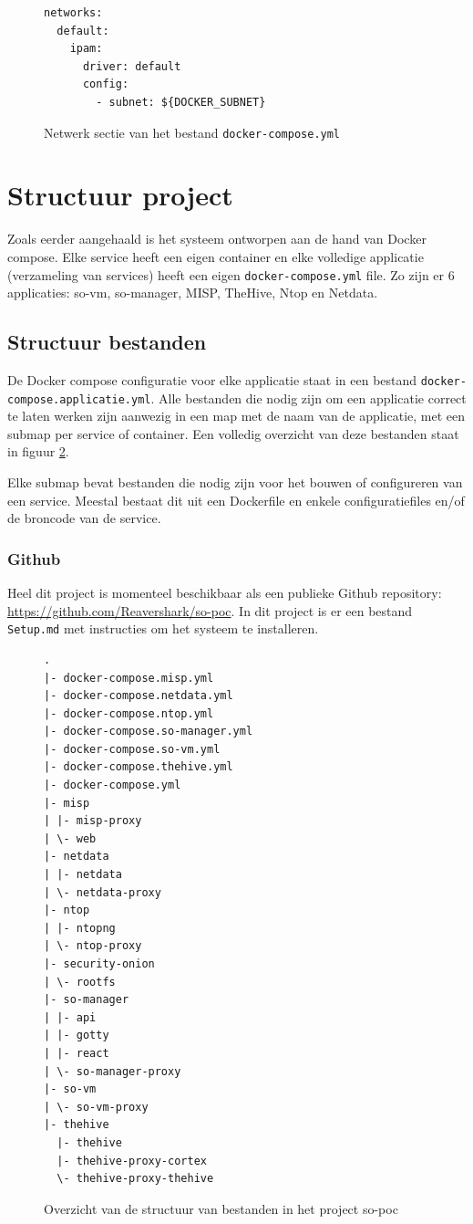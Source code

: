 \documentclass[a4paper, 12pt]{report}
\begin{document}
\begin{figure}[H]
  \begin{lstlisting}
networks:
  default:
    ipam:
      driver: default
      config:
        - subnet: ${DOCKER_SUBNET}
  \end{lstlisting}
  \caption{Netwerk sectie van het bestand \lstinline|docker-compose.yml|}
  \label{fig:docker-compose-network}
\end{figure}

\section{Structuur project}
Zoals eerder aangehaald is het systeem ontworpen aan de hand van Docker compose.
Elke service heeft een eigen container en elke volledige applicatie (verzameling van services) heeft een eigen \lstinline|docker-compose.yml| file.
Zo zijn er 6 applicaties: so-vm, so-manager, MISP, TheHive, Ntop en Netdata.

\subsection{Structuur bestanden}
De Docker compose configuratie voor elke applicatie staat in een bestand \lstinline|docker-compose.applicatie.yml|.
Alle bestanden die nodig zijn om een applicatie correct te laten werken zijn aanwezig in een map met de naam van de applicatie, met een submap per service of container.
Een volledig overzicht van deze bestanden staat in figuur \ref{fig:so-poc-structuur-docker-compose-containers}.

Elke submap bevat bestanden die nodig zijn voor het bouwen of configureren van een service.
Meestal bestaat dit uit een Dockerfile en enkele configuratiefiles en/of de broncode van de service.

\subsubsection{Github}
Heel dit project is momenteel beschikbaar als een publieke Github repository: \url{https://github.com/Reavershark/so-poc}.
In dit project is er een bestand \lstinline|Setup.md| met instructies om het systeem te installeren.

\begin{figure}[H]
  \begin{lstlisting}
.
|- docker-compose.misp.yml
|- docker-compose.netdata.yml
|- docker-compose.ntop.yml
|- docker-compose.so-manager.yml
|- docker-compose.so-vm.yml
|- docker-compose.thehive.yml
|- docker-compose.yml
|- misp
| |- misp-proxy
| \- web
|- netdata
| |- netdata
| \- netdata-proxy
|- ntop
| |- ntopng
| \- ntop-proxy
|- security-onion
| \- rootfs
|- so-manager
| |- api
| |- gotty
| |- react
| \- so-manager-proxy
|- so-vm
| \- so-vm-proxy
|- thehive
  |- thehive
  |- thehive-proxy-cortex
  \- thehive-proxy-thehive
  \end{lstlisting}
  \caption{Overzicht van de structuur van bestanden in het project so-poc}
  \label{fig:so-poc-structuur-docker-compose-containers}
\end{figure}
\end{document}
